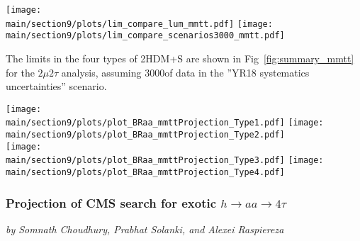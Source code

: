 \begin{figure*}[hbpt]
\centering
        \texttt{[image: \\main/section9/plots/lim\_compare\_lum\_mmtt.pdf]}
        \texttt{[image: \\main/section9/plots/lim\_compare\_scenarios3000\_mmtt.pdf]}\\
    \caption{Left: Projected expected limits on $(\sigma(h)/\sigma_{\textrm{SM}}) \mathcal{B}(h \to aa \to 2\mu 2\tau)$, for 36, 300, and 3000 fb$^{-1}$. Right: Projected expected limits on $(\sigma(h)/\sigma_{\textrm{SM}}) \mathcal{B}(h\to aa \to 2\mu2\tau)$, comparing different scenarios for systematic uncertainties for an integrated luminosity of 3000\fbinv.}
    \label{fig:mmtt_proj}
\end{figure*}

The limits in the four types of 2HDM+S are shown
in Fig~\ref{fig:summary_mmtt} for the $2\mu 2\tau$ analysis, assuming 3000\fbinv of data in the ''YR18 systematics uncertainties'' scenario.

\begin{figure*}[hbpt]
\centering
        \texttt{[image: \\main/section9/plots/plot\_BRaa\_mmttProjection\_Type1.pdf]}
        \texttt{[image: \\main/section9/plots/plot\_BRaa\_mmttProjection\_Type2.pdf]} \\
        \texttt{[image: \\main/section9/plots/plot\_BRaa\_mmttProjection\_Type3.pdf]}
        \texttt{[image: \\main/section9/plots/plot\_BRaa\_mmttProjection\_Type4.pdf]}
    \caption{Expected upper limits on $(\sigma(h)/\sigma_{\textrm{SM}})\mathcal{B}(h\to aa)$ for 3000\fbinv of data with YR18 systematic uncertainties for the $2\mu 2\tau$ final state in 2HDM+S type-1 (top left), type-2 (top right), type-3 (bottom left), and type-4 (bottom right).}
    \label{fig:summary_mmtt}
\end{figure*}


\subsubsection{Projection of CMS search for exotic $h\to aa \to 4\tau$}
\begin{center}
 {\it{ by Somnath Choudhury, Prabhat Solanki, and Alexei Raspiereza}}
\end{center}

